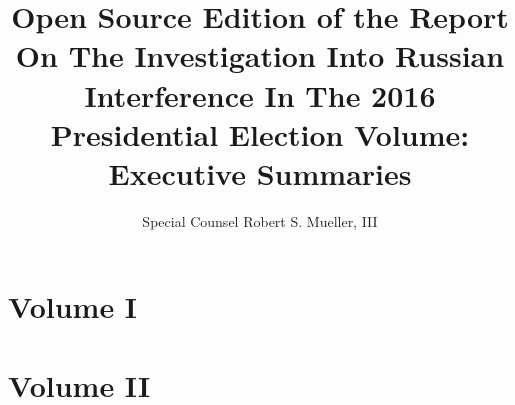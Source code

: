\documentclass[12pt]{book}
\title{Open Source Edition of the Report On The Investigation Into Russian Interference In The 2016 Presidential Election Volume: Executive Summaries}
\author{Special Counsel Robert S. Mueller, III}
\begin{document}




\chapter{Volume I}





\chapter{Volume II}




\end{document}

